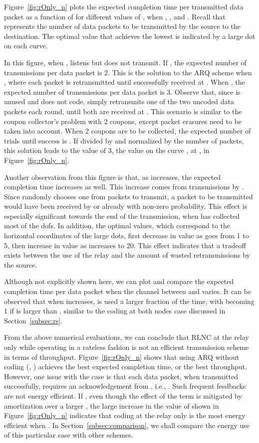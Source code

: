 \documentclass[journal, letterpaper]{IEEEtran}
\begin{document}
\begin{itemize}
Figure~\ref{fig:rOnly_n} plots the expected completion time per transmitted data packet as a function of  for different values of , when , , and . Recall that  represents the number of data packets to be transmitted by the source to the destination. The optimal  value that achieves the lowest  is indicated by a large dot on each curve.

In this figure, when ,  listens but does not transmit. If , the expected number of transmissions per data packet is 2. This is the solution to the ARQ scheme when , where each packet is retransmitted until successfully received at . When , the expected number of transmissions per data packet is 3. Observe that, since  is unused and  does not code,  simply retransmits one of the two uncoded data packets each round, until both are received at . This scenario is similar to the coupon collector's problem with 2 coupons, except packet erasures need to be taken into account. When 2 coupons are to be collected, the expected number of trials until success is . If divided by  and normalized by the number of packets, this solution leads to the value of 3, the value on the curve , at , in Figure~\ref{fig:rOnly_n}.

Another observation from this figure is that, as  increases, the expected completion time  increases as well. This increase comes from transmissions by . Since  randomly chooses one from  packets to transmit, a packet to be transmitted would have been received by  or  already with non-zero probability. This effect is especially significant towards the end of the transmission, when  has collected most of the dofs. In addition, the optimal  values, which correspond to the horizontal coordinates of the large dots, first decrease in value as  goes from 1 to 5, then increase in value as  increases to 20. This effect indicates that a tradeoff exists between the use of the relay and the amount of wasted retransmissions by the source.

Although not explicitly shown here, we can plot and compare the expected completion time per data packet when the channel between  and  varies. It can be observed that when  increases,  is used a larger fraction of the time, with  becoming 1 if  is larger than , similar to the coding at both nodes case discussed in Section~\ref{subsec:rs}.

From the above numerical evaluations, we can conclude that RLNC at the relay  only while operating in a rateless fashion is not an efficient transmission scheme in terms of throughput. Figure~\ref{fig:rOnly_n} shows that using ARQ without coding (, ) achieves the best expected completion time, or the best throughput. However, one issue with the  case is that each data packet, when transmitted successfully, requires an acknowledgement from , i.e., . Such frequent feedbacks are not energy efficient. If , even though the effect of the  term is mitigated by amortization over a larger , the large increase in the value of  shown in Figure~\ref{fig:rOnly_n} indicates that coding at the relay only is the most energy efficient when . In Section~\ref{subsec:comparison}, we shall compare the energy use of this particular case with other schemes.


\end{itemize}
\end{document}
